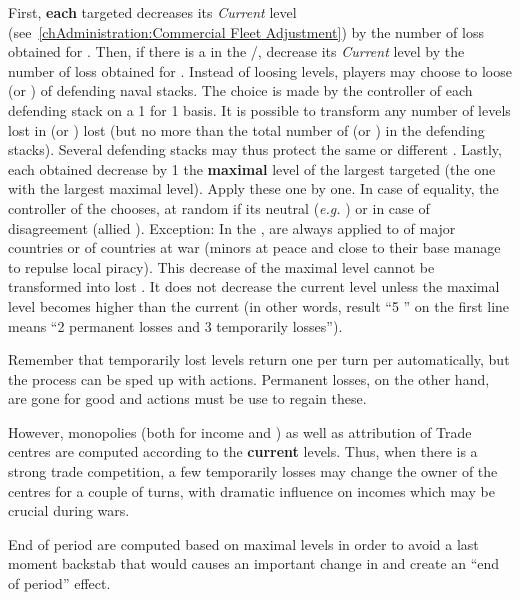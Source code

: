\bparag First, \textbf{each} targeted \TradeFLEET\facemoins decreases its
\emph{Current} level (see~\ref{chAdministration:Commercial Fleet Adjustment})
by the number of loss obtained for \TradeFLEET\facemoins.
\bparag Then, if there is a \TradeFLEET\faceplus in the \STZ/\CTZ, decrease
its \emph{Current} level by the number of loss obtained for
\TradeFLEET\faceplus.
\bparag Instead of loosing \TradeFLEET levels, players may choose to loose \ND
(or \NGD) of defending naval stacks. The choice is made by the controller of
each defending stack on a 1 for 1 basis. It is possible to transform any
number of levels lost in \ND (or \NGD) lost (but no more than the total number
of \ND (or \NGD) in the defending stacks). Several defending stacks may thus
protect the same or different \TradeFLEET.
\bparag Lastly, each \textetoile obtained decrease by 1 the \textbf{maximal}
level of the largest targeted \TradeFLEET (the one with the largest maximal
level). Apply these \textetoile one by one. In case of equality, the
controller of the \corsaire chooses, at random if its neutral (\emph{e.g.}
) or in case of disagreement (allied \corsaire).
\bparag Exception: In the \ROTW, \textetoile are always applied to \TradeFLEET
of major countries or of countries at war (minors at peace and close to their
base manage to repulse local piracy).
\bparag This decrease of the maximal level cannot be transformed into lost
\ND. It does not decrease the current level unless the maximal level becomes
higher than the current (in other words, result ``5 \textetoile\textetoile''
on the first line means ``2 permanent losses and 3 temporarily losses'').

\begin{playtip}
  Remember that temporarily lost levels return one per turn per \TradeFLEET
  automatically, but the process can be sped up with \TFI actions. Permanent
  losses, on the other hand, are gone for good and \TFI actions must be use to
  regain these.

  However, monopolies (both for income and \VPs) as well as attribution of
  Trade centres are computed according to the \textbf{current} levels. Thus,
  when there is a strong trade competition, a few temporarily losses may
  change the owner of the centres for a couple of turns, with dramatic
  influence on incomes which may be crucial during wars.

  End of period \VPs are computed based on maximal levels in order to avoid a
  last moment backstab that would causes an important change in \VPs and
  create an ``end of period'' effect.
\end{playtip}

